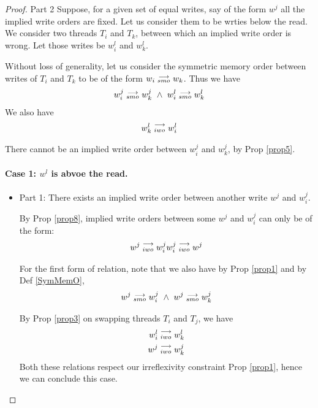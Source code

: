         \begin{proof}{Part 2}
            Suppose, for a given set of equal writes, say of the form $w^j$ all the implied write orders are fixed. Let us consider them to be wrties below the read. We consider two threads $T_i$ and $T_k$, between which an implied write order is wrong. Let those writes be $w_i^l$ and $w_k^l$. 

            Without loss of generality, let us consider the symmetric memory order between writes of $T_i$ and $T_k$ to be of the form $w_i\stackrel{\longrightarrow}{_{smo}}w_k$. Thus we have 
            \begin{align*}
                \reln{w_i^j}{smo}{w_k^j} \ \wedge \ \reln{w_i^l}{smo}{w_k^l}
            \end{align*}
            We also have 
            \begin{align*}
                w_k^l\stackrel{\longrightarrow}{_{iwo}}w_i^l
            \end{align*}

            There cannot be an implied write order between $w_i^j$ and $w_k^j$, by Prop \ref{prop5}. 

            \paragraph{Case 1: $w^l$ is abvoe the read.}

                \begin{itemize}
                    \item Part 1: There exists an implied write order between another write $w^j$ and $w_i^j$.

                        By Prop \ref{prop8}, implied write orders between some $w^j$ and $w_i^j$ can only be of the form:
                        \begin{align*}
                            w^j\stackrel{\longrightarrow}{_{iwo}}w_i^j
                            w_i^j\stackrel{\longrightarrow}{_{iwo}}w^j
                        \end{align*}

                        For the first form of relation, note that we also have by Prop \ref{prop1} and by Def \ref{SymMemO}, 
                        \begin{align*}
                            \reln{w^j}{smo}{w_i^j} \ \wedge \ \reln{w^j}{smo}{w_k^j}
                        \end{align*}

                        By Prop \ref{prop3} on swapping threads $T_i$ and $T_j$, we have 
                        \begin{align*}
                            w_i^l\stackrel{\longrightarrow}{_{iwo}}w_k^l \\ 
                            w^j\stackrel{\longrightarrow}{_{iwo}}w_k^j
                        \end{align*}
                        Both these relations respect our irreflexivity constraint Prop \ref{prop1}, hence we can conclude this case. 


\end{itemize}
\end{proof}
